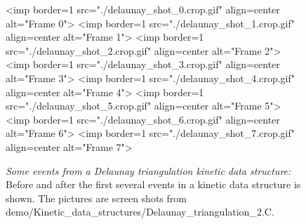 \begin{figure}[htb]
\begin{ccTexOnly}
\begin{center}
\end{center}
\end{ccTexOnly}
\begin{ccHtmlOnly}
<imp border=1 src="./delaunay_shot_0.crop.gif" align=center alt="Frame 0">
<imp border=1 src="./delaunay_shot_1.crop.gif" align=center alt="Frame 1">
<imp border=1 src="./delaunay_shot_2.crop.gif" align=center alt="Frame 2">
<imp border=1 src="./delaunay_shot_3.crop.gif" align=center alt="Frame 3">
<imp border=1 src="./delaunay_shot_4.crop.gif" align=center alt="Frame 4">
<imp border=1 src="./delaunay_shot_5.crop.gif" align=center alt="Frame 5">
<imp border=1 src="./delaunay_shot_6.crop.gif" align=center alt="Frame 6">
<imp border=1 src="./delaunay_shot_7.crop.gif" align=center alt="Frame 7">
\end{ccHtmlOnly}
\caption{ \label{fig:delaunay_events} 
{\em Some events from a Delaunay triangulation kinetic data structure:} Before and after the first several events in a kinetic data structure is shown. The pictures are screen shots from demo/Kinetic\_data\_structures/Delaunay\_triangulation\_2.C. }
\end{figure}


\label{fig:delaunay_2_usage_program}
